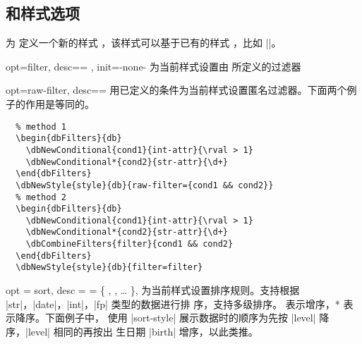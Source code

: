 \documentclass[full]{l3doc}
\begin{document}
\begin{documentation}
\subsection{ 和样式选项}

\begin{function}{\dbNewStyle}
  \begin{syntax}
        
  \end{syntax}

  为  定义一个新的样式 ，该样式可以基于已有的样式
  ，比如 ||。
\end{function}

\bigskip

\begin{option}{opt=filter, desc={= }, init=-none-}
  为当前样式设置由  所定义的过滤器
\end{option}

\begin{option}{opt=raw-filter, desc={= }}
  用已定义的条件为当前样式设置匿名过滤器。下面两个例子的作用是等同的。
\end{option}

\begin{verbatim}
  % method 1
  \begin{dbFilters}{db}
    \dbNewConditional{cond1}{int-attr}{\rval > 1}
    \dbNewConditional*{cond2}{str-attr}{\d+}
  \end{dbFilters}
  \dbNewStyle{style}{db}{raw-filter={cond1 && cond2}}
  % method 2
  \begin{dbFilters}{db}
    \dbNewConditional{cond1}{int-attr}{\rval > 1}
    \dbNewConditional*{cond2}{str-attr}{\d+}
    \dbCombineFilters{filter}{cond1 && cond2}
  \end{dbFilters}
  \dbNewStyle{style}{db}{filter=filter}
\end{verbatim}

\begin{option}{
  opt = sort,
  desc = {= \{ , , \ldots{} \}},
}
  为当前样式设置排序规则。支持根据 |str|，|date|，|int|，|fp| 类型的数据进行排
  序，支持多级排序。 表示增序，* 表示降序。下面例子中，
  使用 |sort-style| 展示数据时的顺序为先按 |level| 降序，|level| 相同的再按出
  生日期 |birth| 增序，以此类推。
\end{option}


\end{documentation}
\end{document}
